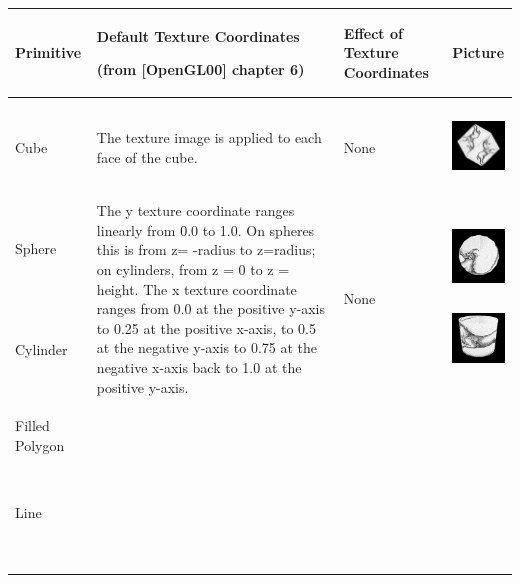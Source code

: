 \begin{center}
\tablehead{}
\begin{supertabular}{|m{0.7122598in}|m{3.22956in}|m{0.9816598in}|m{0.7559598in}|}
\hline
Primitive &
Default Texture Coordinates

(from [OpenGL00] chapter 6) &
Effect of Texture Coordinates &
Picture\\\hline
Cube &
The texture image is applied to each face of the cube.  &
None &
\begin{center}
\includegraphics[width=0.6602in,height=0.6602in]{ub-img/ub-img24.jpg}
\end{center}
\\\hline
Sphere

~

~

Cylinder &
The y texture coordinate ranges linearly from 0.0 to 1.0. On spheres
this is from\newline
z= -radius to z=radius; on cylinders, from\newline
z = 0 to z = height. The x texture coordinate ranges from 0.0 at the
positive y-axis to 0.25 at the positive x-axis, to 0.5 at the
negative\newline
y-axis to 0.75 at the negative x-axis back to 1.0 at the positive
y-axis.  &
None &


\begin{center}
\includegraphics[width=0.6602in,height=0.6602in]{ub-img/ub-img25.jpg}
\end{center}
\begin{center}
\includegraphics[width=0.6602in,height=0.6602in]{ub-img/ub-img26.jpg}
\end{center}
\\\hline
Filled Polygon

~

Line

~


\end{supertabular}
\end{center}
